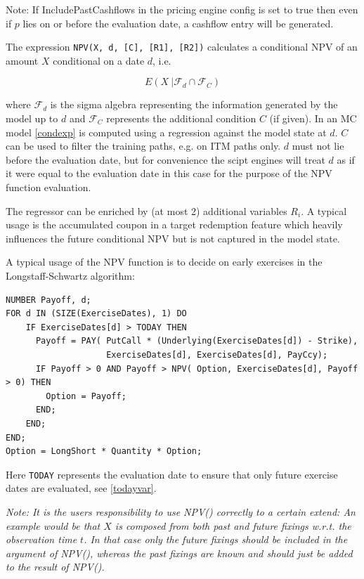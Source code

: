 Note: If IncludePastCashflows in the pricing engine config is set to true then even if $p$ lies on or before the
evaluation date, a cashflow entry will be generated.

\label{function_npv}

The expression {\tt NPV(X, d, [C], [R1], [R2])} calculates a conditional NPV of an amount $X$ conditional on a date $d$, i.e.

\begin{equation}\label{condexp}
  E( X\: | \mathcal{F}_d \cap \mathcal{F}_C )
\end{equation}

where $\mathcal{F}_d$ is the sigma algebra representing the information generated by the model up to $d$ and
$\mathcal{F}_C$ represents the additional condition $C$ (if given). In an MC model \ref{condexp} is computed using a
regression against the model state at $d$. $C$ can be used to filter the training paths, e.g. on ITM paths only. $d$
must not lie before the evaluation date, but for convenience the scipt engines will treat $d$ as if it were equal to the
evaluation date in this case for the purpose of the NPV function evaluation.

The regressor can be enriched by (at most 2) additional variables $R_i$. A typical usage is the accumulated coupon in a
target redemption feature which heavily influences the future conditional NPV but is not captured in the model state.

A typical usage of the NPV function is to decide on early exercises in the Longstaff-Schwartz algorithm:

\begin{verbatim}
NUMBER Payoff, d;
FOR d IN (SIZE(ExerciseDates), 1) DO
    IF ExerciseDates[d] > TODAY THEN
      Payoff = PAY( PutCall * (Underlying(ExerciseDates[d]) - Strike),
                    ExerciseDates[d], ExerciseDates[d], PayCcy);
      IF Payoff > 0 AND Payoff > NPV( Option, ExerciseDates[d], Payoff > 0) THEN
        Option = Payoff;
      END;
    END;
END;
Option = LongShort * Quantity * Option;
\end{verbatim}

Here \verb+TODAY+ represents the evaluation date to ensure that only future exercise dates are evaluated, see
\ref{todayvar}.

{\em Note: It is the users responsibility to use NPV() correctly to a certain extend: An example would be that $X$ is
  composed from both past and future fixings w.r.t. the observation time $t$. In that case only the future fixings
  should be included in the argument of NPV(), whereas the past fixings are known and should just be added to the result
  of NPV().}

